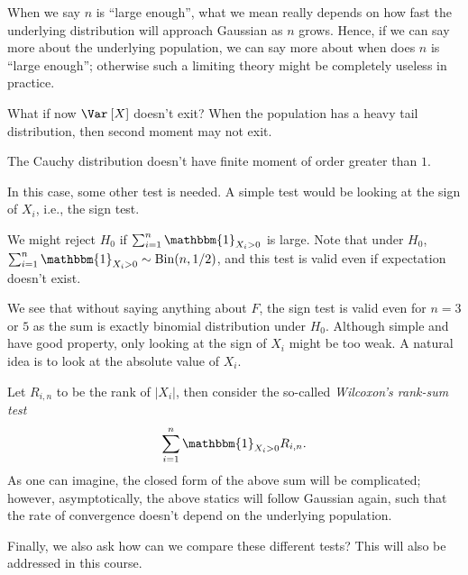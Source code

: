 \begin{remark}
	When we say \(n\) is ``large enough'', what we mean really depends on how fast the underlying distribution will approach Gaussian as \(n\) grows. Hence, if we can say more about the underlying population, we can say more about when does \(n\) is ``large enough''; otherwise such a limiting theory might be completely useless in practice.
\end{remark}

What if now \(\Var_{}\left[X \right] \) doesn't exit? When the population has a heavy tail distribution, then second moment may not exit.

\begin{eg}
	The Cauchy distribution doesn't have finite moment of order greater than \(1\).
\end{eg}

In this case, some other test is needed. A simple test would be looking at the sign of \(X_i\), i.e., the sign test.

\begin{eg}
	We might reject \(H_0\) if \(\sum_{i=1}^{n} \mathbbm{1}_{X_i > 0} \) is large. Note that under \(H_0\), \(\sum_{i=1}^{n} \mathbbm{1}_{X_i > 0} \sim \operatorname{Bin}(n, 1/2) \), and this test is valid even if expectation doesn't exist.
\end{eg}

We see that without saying anything about \(F\), the sign test is valid even for \(n = 3\) or \(5\) as the sum is exactly binomial distribution under \(H_0\). Although simple and have good property, only looking at the sign of \(X_i\) might be too weak. A natural idea is to look at the absolute value of \(X_i\).

\begin{eg}
	Let \(R_{i, n} \) to be the rank of \(\vert X_i \vert \), then consider the so-called \emph{Wilcoxon's rank-sum test}
	\[
		\sum_{i=1}^{n} \mathbbm{1}_{X_i > 0} R_{i, n}.
	\]
	As one can imagine, the closed form of the above sum will be complicated; however, asymptotically, the above statics will follow Gaussian again, such that the rate of convergence doesn't depend on the underlying population.
\end{eg}

Finally, we also ask how can we compare these different tests? This will also be addressed in this course.